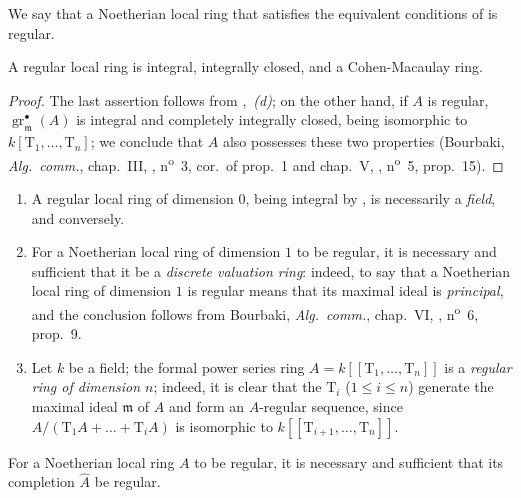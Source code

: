 \begin{definition}[17.1.2]
\label{0.17.1.2}
We say that a Noetherian local ring that satisfies the equivalent conditions of  is regular.
\end{definition}

\begin{corollary}[17.1.3]
\label{0.17.1.3}
A regular local ring is integral, integrally closed, and a Cohen-Macaulay ring.
\end{corollary}

\begin{proof}
The last assertion follows from ,~\emph{(d)};
on the other hand, if $A$ is regular, $\operatorname{gr}^\bullet_\mathfrak{m}(A)$ is integral and completely integrally closed, being isomorphic to $k[\mathrm{T}_1,\ldots,\mathrm{T}_n]$;
we conclude that $A$ also possesses these two properties (Bourbaki, \emph{Alg.~comm.}, chap.~III, , n\textsuperscript{o}~3, cor.\ of prop.~1 and chap.~V, , n\textsuperscript{o}~5, prop.~15).
\end{proof}

\begin{example}[17.1.4]
\label{0.17.1.4}
\begin{enumerate}
  \item[{\rm(i)}] A regular local ring of dimension $0$, being integral by , is necessarily a \emph{field}, and conversely.
  \item[{\rm(ii)}] For a Noetherian local ring of dimension $1$ to be regular, it is necessary and sufficient that it be a \emph{discrete valuation ring}:
  indeed, to say that a Noetherian local ring of dimension $1$ is regular means that its maximal ideal is \emph{principal}, and the conclusion follows from Bourbaki, \emph{Alg.~comm.}, chap.~VI, , n\textsuperscript{o}~6, prop.~9.
  \item[{\rm(iii)}] Let $k$ be a field; the formal power series ring $A=k[[\mathrm{T}_1,\ldots,\mathrm{T}_n]]$ is a \emph{regular ring of dimension $n$};
  indeed, it is clear that the $\mathrm{T}_i$ ($1\leq i\leq n$) generate the maximal ideal $\mathfrak{m}$ of $A$ and form an $A$-regular sequence, since $A/(\mathrm{T}_1 A+\ldots+\mathrm{T}_i A)$ is isomorphic to $k[[\mathrm{T}_{i+1},\ldots,\mathrm{T}_n]]$.
\end{enumerate}
\end{example}

\begin{proposition}[17.1.5]
\label{0.17.1.5}
For a Noetherian local ring $A$ to be regular, it is necessary and sufficient that its completion $\widehat{A}$ be regular.
\end{proposition}

